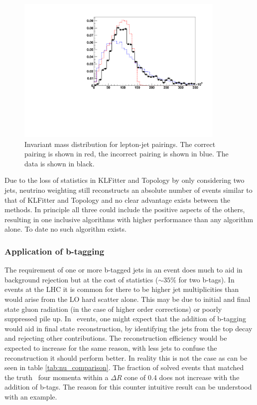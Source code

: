 \begin{figure}[htbp!]
     \begin{center}
     \includegraphics[width=100mm]{f/InvariantMassLepBjet}
     \end{center}
     \caption{Invariant mass distribution for lepton-jet pairings. The correct pairing is shown in red, the incorrect pairing is shown in blue. The data is shown in black.}
     \label{fig:lep_jet_mass}
    \end{figure}


Due to the loss of statistics in KLFitter and Topology by only considering two jets, neutrino weighting still reconstructs an absolute number of events similar to that of KLFitter and Topology and no clear advantage exists between the methods. In principle all three could include the positive aspects of the others, resulting in one inclusive algorithms with higher performance than any algorithm alone. To date no such algorithm exists.


\subsubsection{Application of b-tagging}
\label{sec:btagged_selection}
The requirement of one or more b-tagged jets in an event does much to aid in background rejection but at the cost of statistics ($\sim35\%$ for two b-tags). In events at the LHC it is common for there to be higher jet multiplicities than would arise from the LO hard scatter alone. This may be due to initial and final state gluon radiation (in the case of higher order corrections) or poorly suppressed pile up. In \ttbar\ events, one might expect that the addition of b-tagging would aid in final state reconstruction, by identifying the jets from the top decay and rejecting other contributions. The reconstruction efficiency would be expected to increase for the same reason, with less jets to confuse the reconstruction it should perform better. In reality this is not the case as can be seen in table \ref{tab:nu_comparison}. The fraction of solved events that matched the truth \ttbar\ four momenta within a $\Delta R$ cone of 0.4 does not increase with the addition of b-tags. The reason for this counter intuitive result can be understood with an example.

